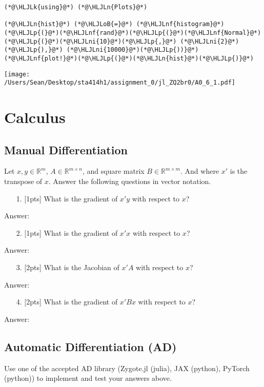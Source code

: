 \documentclass[12pt,a4paper]{article}
\newcommand{\HLJLk}[1]{\textcolor[RGB]{148,91,176}{\textbf{#1}}}
\newcommand{\HLJLn}[1]{#1}
\newcommand{\HLJLnf}[1]{\textcolor[RGB]{66,102,213}{#1}}
\newcommand{\HLJLni}[1]{\textcolor[RGB]{59,151,46}{#1}}
\newcommand{\HLJLoB}[1]{\textcolor[RGB]{102,102,102}{\textbf{#1}}}
\newcommand{\HLJLp}[1]{#1}
\begin{document}
\begin{lstlisting}
(*@\HLJLk{using}@*) (*@\HLJLn{Plots}@*)

(*@\HLJLn{hist}@*) (*@\HLJLoB{=}@*) (*@\HLJLnf{histogram}@*)(*@\HLJLp{(}@*)(*@\HLJLnf{rand}@*)(*@\HLJLp{(}@*)(*@\HLJLnf{Normal}@*)(*@\HLJLp{(}@*)(*@\HLJLni{10}@*)(*@\HLJLp{,}@*) (*@\HLJLni{2}@*)(*@\HLJLp{),}@*) (*@\HLJLni{10000}@*)(*@\HLJLp{))}@*)
(*@\HLJLnf{plot!}@*)(*@\HLJLp{(}@*)(*@\HLJLn{hist}@*)(*@\HLJLp{)}@*)
\end{lstlisting}

\texttt{[image: /Users/Sean/Desktop/sta414h1/assignment\_0/jl\_ZQ2br0/A0\_6\_1.pdf]}

\section{Calculus}
\subsection{Manual Differentiation}
Let $x,y \in \mathbb{R}^m$, $A \in \mathbb{R}^{m \times n}$, and square matrix $B \in \mathbb{R}^{m \times m}$. And where $x'$ is the transpose of $x$. Answer the following questions in vector notation.

\begin{itemize}
\item[1. ] [1pts] What is the gradient of $x'y$ with respect to $x$?

\end{itemize}
Answer:

\begin{itemize}
\item[2. ] [1pts] What is the gradient of $x'x$ with respect to $x$?

\end{itemize}
Answer:

\begin{itemize}
\item[3. ] [2pts] What is the Jacobian of $x'A$ with respect to $x$?

\end{itemize}
Answer:

\begin{itemize}
\item[4. ] [2pts] What is the gradient of $x'Bx$ with respect to $x$?

\end{itemize}
Answer:

\subsection{Automatic Differentiation (AD)}
Use one of the accepted AD library (Zygote.jl (julia), JAX (python), PyTorch (python)) to implement and test your answers above.
\end{document}
